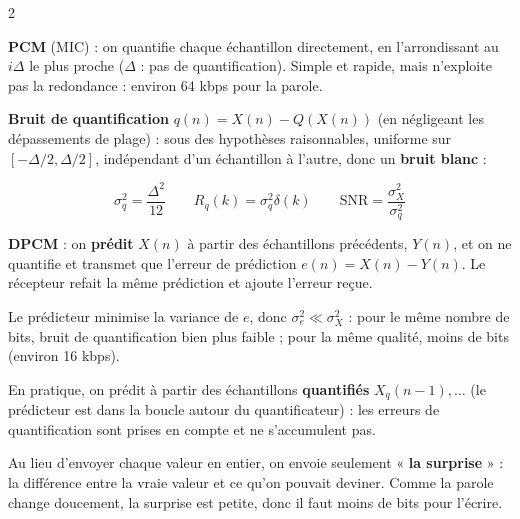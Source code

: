 \documentclass[a4paper,9pt]{extarticle}
\begin{document}
\begin{multicols}{2}
\begin{definition}

\textbf{PCM} (MIC) : on quantifie chaque échantillon directement, en l'arrondissant au $i\Delta$
le plus proche ($\Delta$ : pas de quantification). Simple et rapide, mais n'exploite pas la
redondance : environ 64 kbps pour la parole.

\vspace{3pt}

\textbf{Bruit de quantification} $q(n) = X(n) - Q(X(n))$ (en négligeant les dépassements de
plage) : sous des hypothèses raisonnables, uniforme sur $[-\Delta/2,\Delta/2]$, indépendant
d'un échantillon à l'autre, donc un \textbf{bruit blanc} :

\[
\sigma_q^2 = \frac{\Delta^2}{12} \qquad R_q(k) = \sigma_q^2\delta(k) \qquad \mathrm{SNR} =
\frac{\sigma_X^2}{\sigma_q^2}
\]

\end{definition}


\begin{definition}

\textbf{DPCM} : on \textbf{prédit} $X(n)$ à partir des échantillons précédents, $Y(n)$, et on ne
quantifie et transmet que l'erreur de prédiction $e(n) = X(n) - Y(n)$. Le récepteur refait la
même prédiction et ajoute l'erreur reçue.

\vspace{3pt}

Le prédicteur minimise la variance de $e$, donc $\sigma_e^2 \ll \sigma_X^2$ : pour le même
nombre de bits, bruit de quantification bien plus faible ; pour la même qualité, moins de bits
(environ 16 kbps).

\end{definition}


\begin{important}

En pratique, on prédit à partir des échantillons \textbf{quantifiés} $X_q(n-1),\dots$ (le
prédicteur est dans la boucle autour du quantificateur) : les erreurs de quantification sont
prises en compte et ne s'accumulent pas.

\end{important}


\begin{simple}

Au lieu d'envoyer chaque valeur en entier, on envoie seulement « \textbf{la surprise} » : la
différence entre la vraie valeur et ce qu'on pouvait deviner. Comme la parole change
doucement, la surprise est petite, donc il faut moins de bits pour l'écrire.


\end{simple}
\end{multicols}
\end{document}
